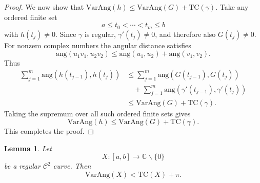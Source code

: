\documentclass[10pt,a4paper]{amsart}
\newtheorem{lemma}[theorem]{Lemma}
\newcommand{\C}{\mathbb{C}}
\newcommand{\ang}{\mathrm{ang}}
\newcommand{\T}{\mathrm{TC}}
\newcommand{\VA}{\mathrm{VarAng}}
\newcommand{\cC}{\mathcal{C}}
\numberwithin{equation}{section}
\begin{document}
\begin{proof}
We now show that $\VA(h)\le \VA(G)+\T(\gamma)$.
Take any ordered finite set
\[a\le t_0<\cdots<t_m\le b \]
with $h(t_j)\ne0$. Since $\gamma$ is regular, $\gamma'(t_j)\ne0$, and therefore also $G(t_j)\ne0$. For nonzero complex numbers the angular distance satisfies
\[
\ang(u_1v_1,u_2v_2)\le \ang(u_1,u_2)+\ang(v_1,v_2).\]
Thus
\begin{align*}
\sum_{j=1}^m \ang\left(h(t_{j-1}),h(t_j)\right)
&\le
\sum_{j=1}^m \ang\left(G(t_{j-1}),G(t_j)\right)\\
&\quad+
\sum_{j=1}^m \ang\left(\gamma'(t_{j-1}),\gamma'(t_j)\right)\\
&\le \VA(G)+\T(\gamma).
\end{align*}
Taking the supremum over all such ordered finite sets gives
\[
\VA(h)\le \VA(G)+\T(\gamma).
\]
This completes the proof.
\end{proof}


\begin{lemma}\label{L3}
Let
\[X:[a,b]\longrightarrow \C\backslash\{0\}
\]
be a regular $\cC^2$ curve. Then
\[\VA(X)<\T(X)+\pi.\]
\end{lemma}
\end{document}
